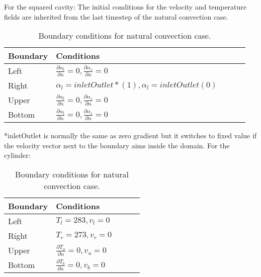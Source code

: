 For the squared cavity:
The initial conditions for the velocity and temperature fields are inherited from the last timestep of the natural convection case.
\begin{table}[h!]
	\begin{tabular}{@{}lllll@{}}
		\toprule[1pt]
		\textbf{Boundary} & \textbf{Conditions}  \\ \midrule[2pt]
		Left & $\frac{\partial \alpha_{l}}{\partial n} = 0, \frac{\partial \alpha_{s}}{\partial n} = 0    $  \\
		Right & $\alpha_{l} = inletOutlet* (1), \alpha_{l} = inletOutlet (0) $ \\
		Upper & $\frac{\partial \alpha_{l}}{\partial n} = 0, \frac{\partial \alpha_{s}}{\partial n} = 0$  \\
		Bottom & $\frac{\partial \alpha_{l}}{\partial n} = 0, \frac{\partial \alpha_{s}}{\partial n} = 0 $  \\ \bottomrule[1pt]		
	\end{tabular}
	\centering
	\caption{Boundary conditions for natural convection case.}	
	\label{fig:boundaryCdsCavity}
\end{table}
*inletOutlet is normally the same as zero gradient but it switches to fixed value if the velocity vector next to the boundary aims inside the domain.
For the cylinder:
\begin{table}[h!]
	\begin{tabular}{@{}lllll@{}}
		\toprule[1pt]
		\textbf{Boundary} & \textbf{Conditions}  \\ \midrule[2pt]
		Left & $T_{l}=283, v_{l} = 0   $  \\
		Right & $T_{r}=273, v_{r} = 0 $ \\
		Upper & $\frac{\partial T_{u}}{\partial n} = 0, v_{u} = 0$  \\
		Bottom & $\frac{\partial T_{b}}{\partial n} = 0, v_{b} = 0$  \\ \bottomrule[1pt]		
	\end{tabular}
	\centering
	\caption{Boundary conditions for natural convection case.}	
	\label{fig:boundaryCdsCylinder}
\end{table}
